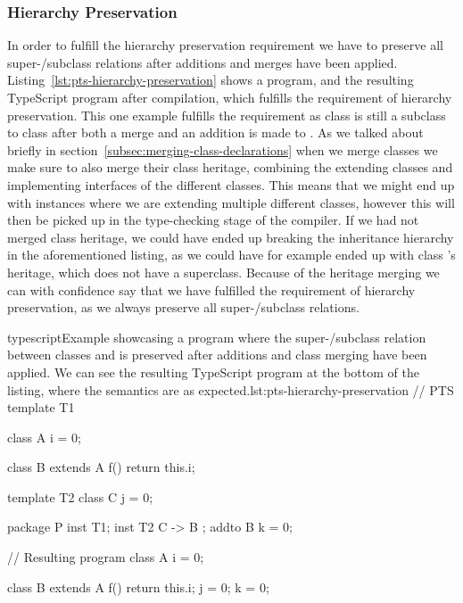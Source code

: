 \subsubsection{Hierarchy Preservation}\label{subsubsec:pts-hierarchy-preservation}

In order to fulfill the hierarchy preservation requirement we have to preserve all super-/subclass relations after additions and merges have been applied.
Listing~\vref{lst:pts-hierarchy-preservation} shows a program, and the resulting TypeScript program after compilation, which fulfills the requirement of hierarchy preservation.
This one example fulfills the requirement as class  is still a subclass to class  after both a merge and an addition is made to .
As we talked about briefly in section~\vref{subsec:merging-class-declarations} when we merge classes we make sure to also merge their class heritage, combining the extending classes and implementing interfaces of the different classes.
This means that we might end up with instances where we are extending multiple different classes, however this will then be picked up in the type-checking stage of the compiler.
If we had not merged class heritage, we could have ended up breaking the inheritance hierarchy in the aforementioned listing, as we could have for example ended up with class 's heritage, which does not have a superclass.
Because of the heritage merging we can with confidence say that we have fulfilled the requirement of hierarchy preservation, as we always preserve all super-/subclass relations.

\begin{code}{typescript}{Example showcasing a program where the super-/subclass relation between classes  and  is preserved after additions and class merging have been applied. We can see the resulting TypeScript program at the bottom of the listing, where the semantics are as expected.}{lst:pts-hierarchy-preservation}
    // PTS
    template T1 {
        class A {
            i = 0;
        }

        class B extends A {
            f() {
                return this.i;
            }
        }
    }

    template T2 {
        class C {
            j = 0;
        }
    }

    package P {
        inst T1;
        inst T2 { C -> B };
        addto B {
            k = 0;
        }
    }

    // Resulting program
    class A {
        i = 0;
    }

    class B extends A {
        f() {
            return this.i;
        }
        j = 0;
        k = 0;
    }
\end{code}

